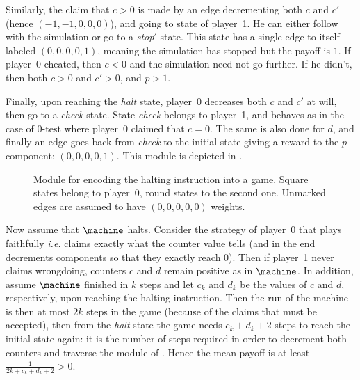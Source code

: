 Similarly, the claim that $c>0$ is made by an edge decrementing both $c$ and $c'$ (hence $(-1,-1,0,0,0)$), and going to state of player~1.
He can either follow with the simulation or go to a \emph{stop$'$} state.
This state has a single edge to itself labeled $(0,0,0,0,1)$, meaning the simulation has stopped but the payoff is $1$.
If player~0 cheated, then $c<0$ and the simulation need not go further.
If he didn't, then both $c>0$ and $c'>0$, and $p>1$.

Finally, upon reaching the \emph{halt} state, player~0 decreases both $c$ and $c'$ at will, then go to a \emph{check} state.
State \emph{check} belongs to player~1, and behaves as in the case of $0$-test where player~0 claimed that $c=0$.
The same is also done for $d$, and finally an edge goes back from \emph{check} to the initial state giving a reward to the $p$ component: $(0,0,0,0,1)$.
This module is depicted in .

\begin{figure}
\centering
{}
\caption[Module for encoding the halting instruction into a game.]{Module for encoding the halting instruction into a game. Square states belong to player~0, round states to the second one. Unmarked edges are assumed to have $(0,0,0,0,0)$ weights.}
\label{tj:fig:halt}
\end{figure}

Now assume that $\machine$ halts.
Consider the strategy of player~0 that plays faithfully \emph{i.e.} claims exactly what the counter value tells (and in the end decrements components so that they exactly reach $0$).
Then if player~1 never claims wrongdoing, counters $c$ and $d$ remain positive as in $\machine$.
In addition, assume $\machine$ finished in $k$ steps and let $c_k$ and $d_k$ be the values of $c$ and $d$, respectively, upon reaching the halting instruction.
Then the run of the machine is then at most $2k$ steps in the game (because of the claims that must be accepted), then from the \emph{halt} state the game needs $c_k+d_k+2$ steps to reach the initial state again: it is the number of steps required in order to decrement both counters and traverse the module of .
Hence the mean payoff is at least $\frac1{2k+c_k+d_k+2}>0$.


